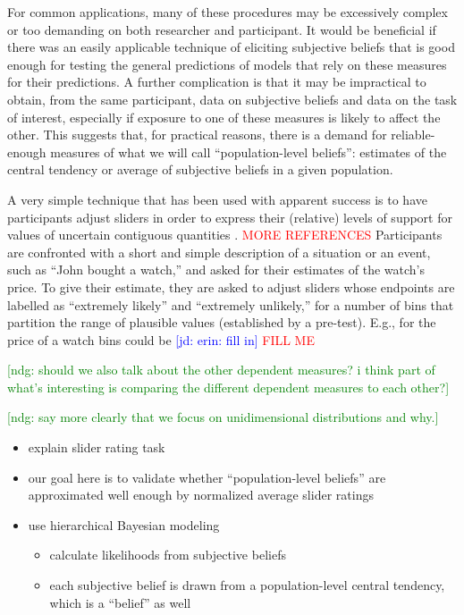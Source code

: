 \documentclass[10pt,letterpaper]{article}
\newcommand{\ndg}[1]{\textcolor{Green}{[ndg: #1]}}
\newcommand{\jd}[1]{\textcolor{Blue}{[jd: #1]}}
\newcommand{\citep}[1]{\cite{#1}}
\begin{document}
For common applications, many of these procedures may be excessively complex or too demanding
on both researcher and participant. It would be beneficial if there was an easily applicable
technique of eliciting subjective beliefs that is good enough for testing the general
predictions of models that rely on these measures for their predictions. A further complication
is that it may be impractical to obtain, from the same participant, data on subjective beliefs
and data on the task of interest, especially if exposure to one of these measures is likely to
affect the other. This suggests that, for practical reasons, there is a demand for
reliable-enough measures of what we will  call ``population-level beliefs'': estimates
of the central tendency or average of subjective beliefs in a given population.

A very simple technique that has been used with apparent success is to have participants adjust
sliders in order to express their (relative) levels of support for values of uncertain
contiguous quantities
\citep{KaoWu2014:Nonliteral-Unde,SchollerFranke2015:Semantic-values}. \textcolor{red}{ MORE REFERENCES } Participants are confronted with a short and simple description of a situation or an
event, such as ``John bought a watch,'' and asked for their estimates of the watch's price. To
give their estimate, they are asked to adjust sliders whose endpoints are labelled as ``extremely
likely'' and ``extremely unlikely,'' for a number of bins that partition the range of plausible
values (established by a pre-test). E.g., for the price of a watch bins could be \jd{erin: fill in}
\textcolor{red}{ FILL ME }

\ndg{should we also talk about the other dependent measures? i think part of what's interesting is comparing the different dependent measures to each other?}

\ndg{say more clearly that we focus on unidimensional distributions and why.}

\begin{itemize}
\item explain slider rating task
\item our goal here is to validate whether ``population-level beliefs'' are approximated well
  enough by normalized average slider ratings
\item use hierarchical Bayesian modeling
  \begin{itemize}
  \item calculate likelihoods from subjective beliefs
  \item each subjective belief is drawn from a population-level central tendency, which is a
    ``belief'' as well
  \end{itemize}
\end{itemize}
\end{document}
